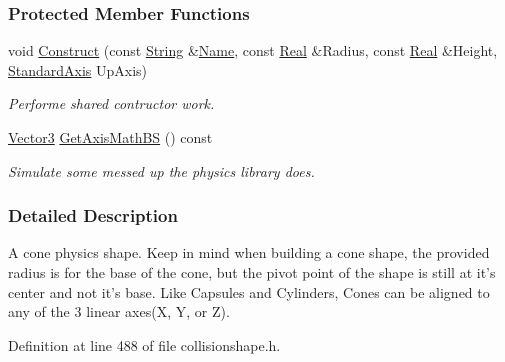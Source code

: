 \subsubsection*{Protected Member Functions}
\begin{DoxyCompactItemize}
\item 
void \hyperlink{classMezzanine_1_1ConeCollisionShape_a5a29f404442602af52499c684c792310}{Construct} (const \hyperlink{namespaceMezzanine_acf9fcc130e6ebf08e3d8491aebcf1c86}{String} \&\hyperlink{classMezzanine_1_1CollisionShape_aac524c5c56fa4d158bc071f8aecfbe79}{Name}, const \hyperlink{namespaceMezzanine_a726731b1a7df72bf3583e4a97282c6f6}{Real} \&Radius, const \hyperlink{namespaceMezzanine_a726731b1a7df72bf3583e4a97282c6f6}{Real} \&Height, \hyperlink{namespaceMezzanine_ab41a00a8c6a47b576dc987ec34e16ba1}{StandardAxis} UpAxis)
\begin{DoxyCompactList}\small\item\em Performe shared contructor work. \item\end{DoxyCompactList}\item 
\hyperlink{classMezzanine_1_1Vector3}{Vector3} \hyperlink{classMezzanine_1_1ConeCollisionShape_aa4a1f1f839c3b6761b27b129b60c8e89}{GetAxisMathBS} () const 
\begin{DoxyCompactList}\small\item\em Simulate some messed up the physics library does. \item\end{DoxyCompactList}\end{DoxyCompactItemize}


\subsubsection{Detailed Description}
A cone physics shape. Keep in mind when building a cone shape, the provided radius is for the base of the cone, but the pivot point of the shape is still at it's center and not it's base. Like Capsules and Cylinders, Cones can be aligned to any of the 3 linear axes(X, Y, or Z). 

Definition at line 488 of file collisionshape.h.



